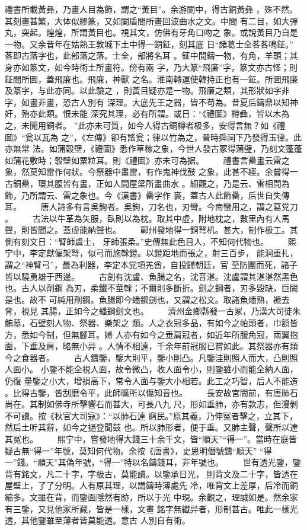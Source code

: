 \documentclass{ctexart}
\begin{document}
禮書所載黃彝，乃畫人目為飾，謂之``黃目''。余游關中，得古銅黃彝 ，殊不然。其刻畫甚繁，大体似繆篆，又如闌盾間所畫回波曲水之文。中間 有二目，如大彈丸，突起。煌煌，所謂黃目也。視其文，仿佛有牙角口吻之 象。或說黃目乃自是一物。又余昔年在姑熟王敦城下土中得一銅鉦，刻其底 日``諸葛士全茖茖鳴鉦。'' 茖即古落字也，此部落之落。士全，部將名耳 。鉦中間鑄一物，有角，羊頭；其身亦如篆文，如今時術土所畫符。傍有兩 字，乃大篆``飛廉''字，篆文亦古怪；則鉦間所圖，蓋飛廉也。飛廉，神獸 之名。淮南轉運使韓持正也有一鉦。所圖飛廉及篆字，与此亦同。以此驗之 ，則黃目疑亦是一物。飛廉之類，其形狀如字非字，如畫非畫，恐古人別有 深理。大底先王之器，皆不苟為。昔夏后鑄鼎以知神奸，殆亦此類。恨未能 深究其理，必有所謂。或日：``《禮圖》樽彝，皆以木為之，未聞用銅者。 ''此亦未可質，如今人得古銅樽者极多，安得言無？如《禮圖》``瓮以瓦為 之''，《左傳》卻有謠瓮；律以竹為之，晉時舜祠下乃發得玉律。此亦無常 法。如蒲穀壁，《禮圖》悉作草稼之象，今世人發古冢得蒲璧，乃刻文蓬蓬 如蒲花敷時；彀壁如粟粒耳。則《禮圖》亦未可為据。 　　禮書言罍畫云雷之象，然莫知雷作何狀。今祭器中畫雷，有作鬼神伐鼓 之象，此甚不經。余嘗得一古銅罍，環其腹皆有畫，正如人間屋梁所畫曲水 。細觀之，乃是云、雷相間為飾，乃所謂云、雷之象也。今《漢書》罍字作 裛，蓋古人此飾罍，后世自失傳耳。 　　唐人詩多有言吳鉤者。吳鉤，刀名也，刃彎。今南蠻用之，謂之葛党刀 。 　　古法以牛革為矢服，臥則以為枕。取其中虛，附地枕之，數里內有人馬 聲，則皆聞之。蓋虛能納聲也。 　　鄆州發地得一銅弩机。甚大，制作极工。其側有刻文日：``臂師虞士， 牙師張柔。''史傳無此色目人，不知何代物也。 　　熙宁中，李定獻偏架弩，似弓而施榦鐙。以鐙距地而張之，射三百步， 能洞重扎，謂之``神臂弓''，最為利器，李定本党項羌酋，自投歸朝廷，官 至防團而死，諸子皆以驍勇雄于西邊。 　　古劍有沈盧、魚腸之名，沈音湛。沈盧謂其湛湛然黑色也。古人以劑鋼 為刃，柔鐵不莖榦；不爾則多斷折。劍之鋼者，刃多毀缺，巨闕是也。故不 可純用劑鋼。魚腸即今蟠鋼劍也，又謂之松文。取諸魚燔熟，褫去脅，視見 其腸，正如今之蟠鋼劍文也。 　　濟州金鄉縣發一古冢，乃漢大司徒朱鮪墓，石壁刻人物、祭器、樂架之 類。人之衣冠多品，有如今之帕頭者，巾額皆方，悉如今制，但無腳耳。婦 人亦有如今之垂肩冠者，如近年所服角冠，兩翼抱面，下垂及肩，略無小异 。人情不相遠，千余年前冠服已嘗如此。其祭器亦有類今之食器者。 　　古人鑄鑒，鑒大則平，鑒小則凸。凡鑒洼則照人而大，凸則照人面小。 小鑒不能全視人面，故令微凸，收人面令小，則鑒雖小而能全納人面，仍復 量鑒之小大，增損高下，常令人面与鑒大小相若。此工之巧智，后人不能造 。比得古鑒，皆刮磨令平，此師曠所以傷知音也。 　　長安故宮闕前，有唐肺石尚在。其制如佛寺所擊響石而甚大，可長八九 尺，形如垂肺，亦有款志，但漫剝不可讀。按《秋官大司寇》：``以肺石達 窮民。''原其義，乃伸冤者擊之，立其下，然后土听其辭，如今之撾登聞鼓 也。所以肺形者，便于垂。又肺主聲，聲所以達其冤也。 　　熙宁中，嘗發地得大錢三十余千文，皆``順天''``得一''。當時在庭皆 疑古無``得一''年號，莫知何代物。余按《唐書》，史思明僭號鑄``順天'' ``得一''錢。``順天''其偽年號，``得一''特以名鑄錢耳，非年號也。 　　世有透光鑒，鑒背有銘文，凡二十字，字极古，莫能讀。以鑒承日光， 則背文及二十字，皆透在屋壁上，了了分明。人有原其理，以謂鑄時薄處先 冷，唯背文上差厚，后冷而銅縮多。文雖在背，而鑒面隱然有跡，所以于光 中現。余觀之，理誠如是。然余家有三鑒，又見他家所藏，皆是一樣，文畫 銘字無纖异者，形制甚古。唯此一樣光透，其他鑒雖至薄者皆莫能透。意古 人別自有術。 
\end{document}

